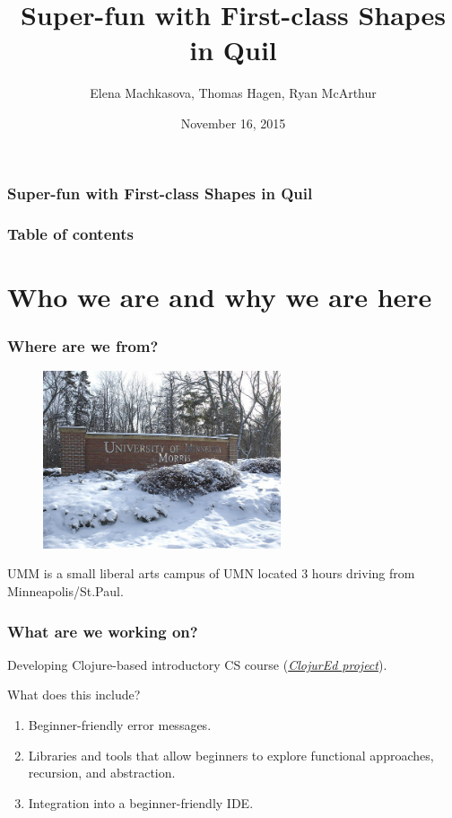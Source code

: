 \documentclass{beamer}
\begin{document}
\author{Elena Machkasova, Thomas Hagen, Ryan McArthur}
\title{Super-fun with First-class Shapes in Quil}
\date{November 16, 2015}


\begin{frame}
\frametitle {Super-fun with First-class Shapes in Quil}
\maketitle
\end{frame}

\begin{frame}
\frametitle{Table of contents}
\tableofcontents  
\end{frame}

\section{Who we are and why we are here}

\begin{frame}
\frametitle{Where are we from?}
\begin{figure}[h]
\includegraphics[width=7cm]{PresentationImages/umm-winter.jpg}
\end{figure}
UMM is a small liberal arts campus of UMN located 3 hours driving from Minneapolis/St.Paul. 
\end{frame}

\begin{frame}
\frametitle{What are we working on?}
Developing Clojure-based introductory CS course ({\it \href{http://cda.morris.umn.edu/~elenam/\#clojure}{ClojurEd project}}). 

What does this include? 
\begin{enumerate}
\item Beginner-friendly error messages. 
\item Libraries and tools that allow beginners to explore functional approaches, recursion, and abstraction.
\item Integration into a beginner-friendly IDE. 
\end{enumerate}
\end{frame}
\end{document}
